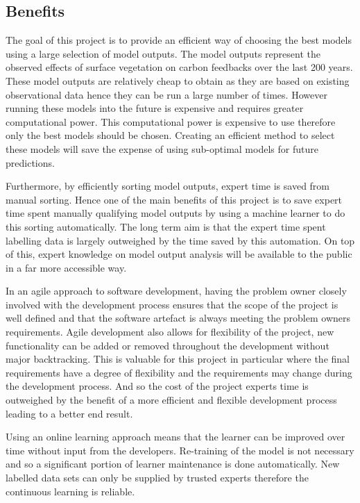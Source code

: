 \documentclass{ecmm427_assignment}
\begin{document}
\subsection{Benefits}
The goal of this project is to provide an efficient way of choosing the best models using a large selection of model outputs. The model outputs represent the observed effects of surface vegetation on carbon feedbacks over the last 200 years. These model outputs are relatively cheap to obtain as they are based on existing observational data hence they can be run a large number of times. However running these models into the future is expensive and requires greater computational power. This computational power is expensive to use therefore only the best models should be chosen. Creating an efficient method to select these models will save the expense of using sub-optimal models for future predictions.\par

Furthermore, by efficiently sorting model outputs, expert time is saved from manual sorting. Hence one of the main benefits of this project is to save expert time spent manually qualifying model outputs by using a machine learner to do this sorting automatically. The long term aim is that the expert time spent labelling data is largely outweighed by the time saved by this automation. On top of this, expert knowledge on model output analysis will be available to the public in a far more accessible way.\par

In an agile approach to software development, having the problem owner closely involved with the development process ensures that the scope of the project is well defined and that the software artefact is always meeting the problem owners requirements. Agile development also allows for flexibility of the project, new functionality can be added or removed throughout the development without major backtracking. This is valuable for this project in particular where the final requirements have a degree of flexibility and the requirements may change during the development process. And so the cost of the project experts time is outweighed by the benefit of a more efficient and flexible development process leading to a better end result.\par

Using an online learning approach means that the learner can be improved over time without input from the developers. Re-training of the model is not necessary and so a significant portion of learner maintenance is done automatically. New labelled data sets can only be supplied by trusted experts therefore the continuous learning is reliable.\par
\end{document}
